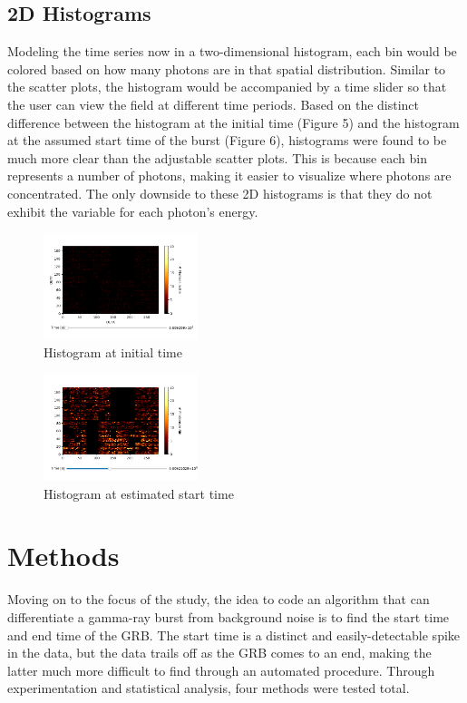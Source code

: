 \documentclass[final,5p,times,twocolumn,authoryear]{elsarticle}
\begin{document}
\subsection{2D Histograms}
Modeling the time series now in a two-dimensional histogram, each bin would be colored based on how many photons are in that spatial distribution. Similar to the scatter plots, the histogram would be accompanied by a time slider so that the user can view the field at different time periods. Based on the distinct difference between the histogram at the initial time (Figure 5) and the histogram at the assumed start time of the burst (Figure 6), histograms were found to be much more clear than the adjustable scatter plots. This is because each bin represents a number of photons, making it easier to visualize where photons are concentrated. The only downside to these 2D histograms is that they do not exhibit the variable for each photon's energy.
\begin{figure}[H]
	\centering 
	\includegraphics[width=0.4\textwidth]{images/2DHistogram.png}	
	\caption{Histogram at initial time} 
	\label{fig_mom0}%
\end{figure}
\begin{figure}[H]
	\centering 
	\includegraphics[width=0.4\textwidth]{images/2DHistogram2.png}	
	\caption{Histogram at estimated start time} 
	\label{fig_mom0}%
\end{figure}

\section{Methods}
Moving on to the focus of the study, the idea to code an algorithm that can differentiate a gamma-ray burst from background noise is to find the start time and end time of the GRB. The start time is a distinct and easily-detectable spike in the data, but the data trails off as the GRB comes to an end, making the latter much more difficult to find through an automated procedure. Through experimentation and statistical analysis, four methods were tested total.
\end{document}
